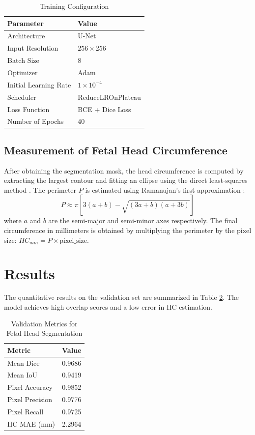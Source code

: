 \documentclass[conference]{IEEEtran}
\begin{document}
\begin{table}[!ht]
    \centering
    \caption{Training Configuration}
    \label{tab:training_config}
    \begin{tabular}{ll}
    \hline
    \textbf{Parameter} & \textbf{Value} \\
    \hline
    Architecture & U-Net \\
    Input Resolution & $256 \times 256$ \\
    Batch Size & 8 \\
    Optimizer & Adam \\
    Initial Learning Rate & $1\times10^{-4}$ \\
    Scheduler & ReduceLROnPlateau \\
    Loss Function & BCE + Dice Loss \\
    Number of Epochs & 40 \\
    \hline
    \end{tabular}
\end{table}

\subsection{Measurement of Fetal Head Circumference}

After obtaining the segmentation mask, the head circumference is computed by extracting the largest contour and fitting an ellipse using the direct least-squares method \cite{fitzgibbon1999direct}. The perimeter $P$ is estimated using Ramanujan's first approximation \cite{ramanujan1914modular}:
\begin{equation}
    P \approx \pi \left[ 3(a + b) - \sqrt{(3a + b)(a + 3b)} \right]
\end{equation}
where $a$ and $b$ are the semi-major and semi-minor axes respectively. The final circumference in millimeters is obtained by multiplying the perimeter by the pixel size: $HC_{mm} = P \times \text{pixel\_size}$.

\section{Results}

The quantitative results on the validation set are summarized in Table \ref{tab:val_metrics}. The model achieves high overlap scores and a low error in HC estimation.

\begin{table}[!ht]
    \centering
    \caption{Validation Metrics for Fetal Head Segmentation}
    \label{tab:val_metrics}
    \begin{tabular}{lc}
    \hline
    \textbf{Metric} & \textbf{Value} \\
    \hline
    Mean Dice & 0.9686 \\
    Mean IoU & 0.9419 \\
    Pixel Accuracy & 0.9852 \\
    Pixel Precision & 0.9776 \\
    Pixel Recall & 0.9725 \\
    HC MAE (mm) & 2.2964 \\
    \hline
    \end{tabular}
\end{table}
\end{document}
